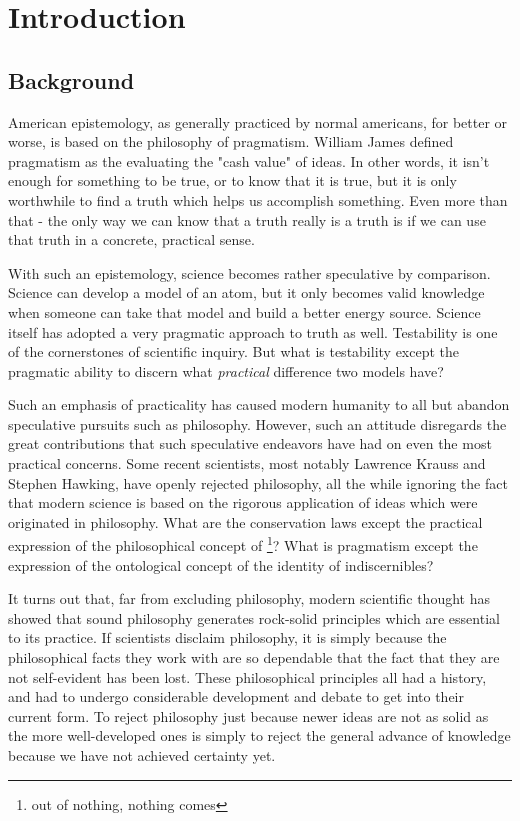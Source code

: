 \chapter{Introduction}

\section{Background}
American epistemology, as generally practiced by normal americans, for better or worse, is based on the philosophy of pragmatism.  William James defined pragmatism as the evaluating the "cash value" of ideas.  In other words, it isn't enough for something to be true, or to know that it is true, but it is only worthwhile to find a truth which helps us accomplish something.  Even more than that - the only way we can know that a truth really is a truth is if we can use that truth in a concrete, practical sense.

With such an epistemology, science becomes rather speculative by comparison.  Science can develop a model of an atom, but it only becomes valid knowledge when someone can take that model and build a better energy source.  Science itself has adopted a very pragmatic approach to truth as well.  Testability is one of the cornerstones of scientific inquiry.  But what is testability except the pragmatic ability to discern what \emph{practical} difference two models have?

Such an emphasis of practicality has caused modern humanity to all but abandon speculative pursuits such as philosophy.  However, such an attitude disregards the great contributions that such speculative endeavors have had on even the most practical concerns.  Some recent scientists, most notably Lawrence Krauss and Stephen Hawking, have openly rejected philosophy, all the while ignoring the fact that modern science is based on the rigorous application of ideas which were originated in philosophy.  What are the conservation laws except the practical expression of the philosophical concept of \footnote{out of nothing, nothing comes}?  What is pragmatism except the expression of the ontological concept of the identity of indiscernibles?

It turns out that, far from excluding philosophy, modern scientific thought has showed that sound philosophy generates rock-solid principles which are essential to its practice.  If scientists disclaim philosophy, it is simply because the philosophical facts they work with are so dependable that the fact that they are not self-evident has been lost.  These philosophical principles all had a history, and had to undergo considerable development and debate to get into their current form.  To reject philosophy just because newer ideas are not as solid as the more well-developed ones is simply to reject the general advance of knowledge because we have not achieved certainty yet.

